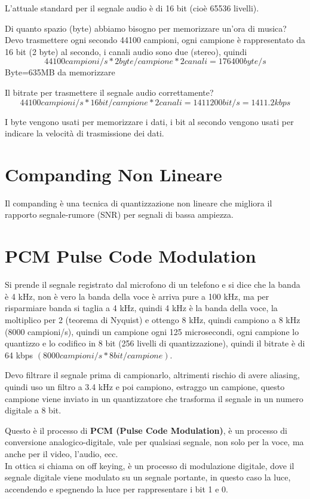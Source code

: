 L'attuale standard per il segnale audio è di 16 bit (cioè 65536 livelli).

Di quanto spazio (byte) abbiamo bisogno per memorizzare un'ora di musica?
Devo trasmettere ogni secondo 44100 campioni, ogni campione è rappresentato da 16 bit 
(2 byte) al secondo, i canali audio sono due (stereo), quindi 
$$44100 campioni/s * 2 byte/campione * 2 canali = 176400 byte/s$$
Byte=635MB da memorizzare

Il bitrate per trasmettere il segnale audio correttamente?
$$44100 campioni/s * 16 bit/campione * 2 canali = 1411200 bit/s = 1411.2 kbps$$

I byte vengono usati per memorizzare i dati, i bit al secondo vengono usati per indicare
la velocità di trasmissione dei dati.

\section{Companding Non Lineare}
Il companding è una tecnica di quantizzazione non lineare che migliora il rapporto 
segnale-rumore (SNR) per segnali di bassa ampiezza.

\section{PCM Pulse Code Modulation}
Si prende il segnale registrato dal microfono di un telefono e si dice che la banda è 4 kHz,
non è vero la banda della voce è arriva pure a 100 kHz, ma per risparmiare banda si taglia a 4 kHz,
quindi 4 kHz è la banda della voce, la moltiplico per 2 (teorema di Nyquist) e ottengo 8 kHz, 
quindi campiono a 8 kHz (8000 campioni/s), quindi un campione ogni 125 microsecondi, ogni campione 
lo quantizzo e lo codifico in 8 bit (256 livelli di quantizzazione), quindi il bitrate è di 64 kbps 
$(8000 campioni/s * 8 bit/campione)$. 

Devo filtrare il segnale prima di campionarlo, altrimenti rischio di avere aliasing, 
quindi uso un filtro a 3.4 kHz e poi campiono, estraggo un campione, questo campione viene
inviato in un quantizzatore che trasforma il segnale in un numero digitale a 8 bit.

Questo è il processo di \textbf{PCM (Pulse Code Modulation)}, è un processo di conversione 
analogico-digitale, vale per qualsiasi segnale, non solo per la voce, ma anche per il video, 
l'audio, ecc.\\

In ottica si chiama on off keying, è un processo di modulazione digitale,
dove il segnale digitale viene modulato su un segnale portante, in questo caso la luce, 
accendendo e spegnendo la luce per rappresentare i bit 1 e 0.\\

